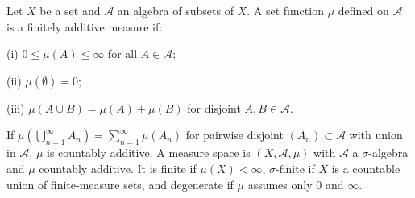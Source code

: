 Let $X$ be a set and $\mathcal{A}$ an algebra of subsets of $X$. A set function $\mu$ defined on $\mathcal{A}$ is a finitely additive measure if:

(i) $0 \leq \mu(A) \leq \infty$ for all $A \in \mathcal{A}$;

(ii) $\mu(\emptyset) = 0$;

(iii) $\mu(A \cup B) = \mu(A) + \mu(B)$ for disjoint $A, B \in \mathcal{A}$.

If $\mu(\bigcup_{n=1}^{\infty} A_n) = \sum_{n=1}^{\infty} \mu(A_n)$ for pairwise disjoint $(A_n) \subset \mathcal{A}$ with union in $\mathcal{A}$, $\mu$ is countably additive. A measure space is $(X, \mathcal{A}, \mu)$ with $\mathcal{A}$ a $\sigma$-algebra and $\mu$ countably additive. It is finite if $\mu(X) < \infty$, $\sigma$-finite if $X$ is a countable union of finite-measure sets, and degenerate if $\mu$ assumes only $0$ and $\infty$.